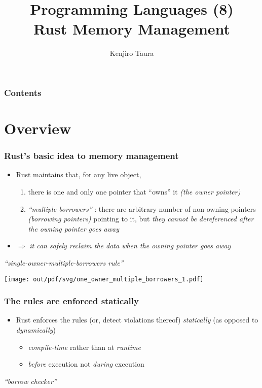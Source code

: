 \documentclass[12pt,dvipdfmx]{beamer}
\title{Programming Languages (8) \\
  Rust Memory Management}
\institute{}
\author{Kenjiro Taura}
\date{}
\newcommand{\mura}[1]{{\color{purple}#1}}
\newcommand{\ao}[1]{{\color{blue}#1}}
\newcommand{\aka}[1]{{\color{red}#1}}
\begin{document}
\maketitle

\begin{frame}
\frametitle{Contents}
\tableofcontents
\end{frame}

\section{Overview}
\begin{frame}
  \frametitle{Rust's basic idea to memory management}
  \begin{itemize}
  \item Rust maintains that, for any live object, 
    \begin{enumerate}
    \item there is one and only one pointer that ``owns'' it
      \mura{\it (the owner pointer)}
    \item \ao{\it ``multiple borrowers''} :
      there are arbitrary number of non-owning pointers
      \ao{\it (borrowing pointers)}
      pointing to it,
      but {\it they cannot be dereferenced after the owning pointer goes away}
    \end{enumerate}
  \item $\Rightarrow$
    {\it it can safely reclaim the data when the owning pointer goes away}
  \end{itemize}
  \begin{center}
    {\large\it ``\mura{single-owner}-\ao{multiple-borrowers} rule''}
    \vskip5mm

    \texttt{[image: out/pdf/svg/one\_owner\_multiple\_borrowers\_1.pdf]}
  \end{center}
\end{frame}

\begin{frame}
  \frametitle{The rules are enforced statically}
  \begin{itemize}
  \item Rust enforces the rules (or, detect violations thereof)
    \ao{\it statically}
    (as opposed to \aka{\it dynamically})
    \begin{itemize}
    \item \ao{\it compile-time} rather than at \aka{\it runtime}
    \item \ao{\it before} execution not \aka{\it during} execution
    \end{itemize}
  \end{itemize}

  \begin{center}
    {\large\it ``borrow checker''}
  \end{center}
  
\end{frame}
\end{document}

